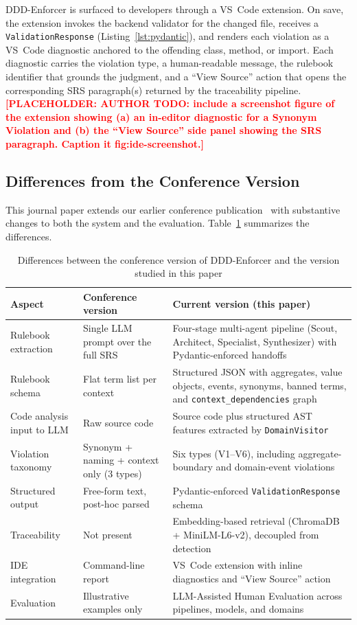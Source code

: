 \documentclass[smallextended]{svjour3}
\newcommand{\placeholder}[1]{\textcolor{red}{\textbf{[PLACEHOLDER: #1]}}}
\begin{document}
DDD-Enforcer is surfaced to developers through a VS~Code extension.
On save, the extension invokes the backend validator for the changed file, receives a \texttt{ValidationResponse} (Listing~\ref{lst:pydantic}), and renders each violation as a VS~Code diagnostic anchored to the offending class, method, or import.
Each diagnostic carries the violation type, a human-readable message, the rulebook identifier that grounds the judgment, and a ``View Source'' action that opens the corresponding SRS paragraph(s) returned by the traceability pipeline.
\placeholder{AUTHOR TODO: include a screenshot figure of the extension showing (a) an in-editor diagnostic for a Synonym Violation and (b) the ``View Source'' side panel showing the SRS paragraph. Caption it fig:ide-screenshot.}

\subsection{Differences from the Conference Version}
\label{sec:arch_old_vs_new}

This journal paper extends our earlier conference publication~\cite{dincoguz2025ddd_conference} with substantive changes to both the system and the evaluation.
Table~\ref{tab:old_vs_new} summarizes the differences.

\begin{table}[t]
\caption{Differences between the conference version of DDD-Enforcer and the version studied in this paper}
\label{tab:old_vs_new}
\centering
\footnotesize
\begin{tabular}{p{3.5cm} p{4.3cm} p{4.3cm}}
\toprule
\textbf{Aspect} & \textbf{Conference version~\cite{dincoguz2025ddd_conference}} & \textbf{Current version (this paper)} \\
\midrule
Rulebook extraction & Single LLM prompt over the full SRS & Four-stage multi-agent pipeline (Scout, Architect, Specialist, Synthesizer) with Pydantic-enforced handoffs \\
Rulebook schema & Flat term list per context & Structured JSON with aggregates, value objects, events, synonyms, banned terms, and \texttt{context\_dependencies} graph \\
Code analysis input to LLM & Raw source code & Source code plus structured AST features extracted by \texttt{DomainVisitor} \\
Violation taxonomy & Synonym + naming + context only (3 types) & Six types (V1--V6), including aggregate-boundary and domain-event violations \\
Structured output & Free-form text, post-hoc parsed & Pydantic-enforced \texttt{ValidationResponse} schema \\
Traceability & Not present & Embedding-based retrieval (ChromaDB + MiniLM-L6-v2), decoupled from detection \\
IDE integration & Command-line report & VS~Code extension with inline diagnostics and ``View Source'' action \\
Evaluation & Illustrative examples only & LLM-Assisted Human Evaluation across pipelines, models, and domains \\
\bottomrule
\end{tabular}
\end{table}
\end{document}
